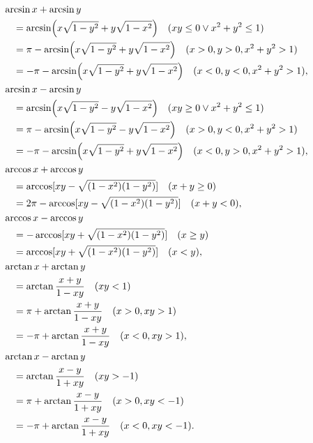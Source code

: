 \begin{theorem}[和差公式]
\begin{align}
&\hspace{-10pt}
\arcsin x + \arcsin y \\
	&= \arcsin(x \sqrt{1-y^2} + y \sqrt{1-x^2})
		\quad(xy\leq0 \lor x^2+y^2\leq1) \\
	&= \pi - \arcsin(x \sqrt{1-y^2} + y \sqrt{1-x^2})
		\quad(x>0, y>0, x^2+y^2>1) \\
	&= -\pi - \arcsin(x \sqrt{1-y^2} + y \sqrt{1-x^2})
		\quad(x<0, y<0, x^2+y^2>1), \\
&\hspace{-10pt}
\arcsin x - \arcsin y \\
	&= \arcsin(x \sqrt{1-y^2} - y \sqrt{1-x^2})
		\quad(xy\geq0 \lor x^2+y^2\leq1) \\
	&= \pi - \arcsin(x \sqrt{1-y^2} - y \sqrt{1-x^2})
		\quad(x>0, y<0, x^2+y^2>1) \\
	&= -\pi - \arcsin(x \sqrt{1-y^2} + y \sqrt{1-x^2})
		\quad(x<0, y>0, x^2+y^2>1), \\
&\hspace{-10pt}
\arccos x + \arccos y \\
	&= \arccos[xy - \sqrt{(1-x^2)(1-y^2)}]
		\quad(x+y\geq0) \\
	&= 2\pi - \arccos[xy - \sqrt{(1-x^2)(1-y^2)}]
		\quad(x+y<0), \\
&\hspace{-10pt}
\arccos x - \arccos y \\
	&= -\arccos[xy + \sqrt{(1-x^2)(1-y^2)}]
		\quad(x \geq y) \\
	&= \arccos[xy + \sqrt{(1-x^2)(1-y^2)}]
		\quad(x<y), \\
&\hspace{-10pt}
\arctan x + \arctan y \\
	&= \arctan\frac{x+y}{1-xy}
		\quad(xy<1) \\
	&= \pi+\arctan\frac{x+y}{1-xy}
		\quad(x>0,xy>1) \\
	&= -\pi+\arctan\frac{x+y}{1-xy}
		\quad(x<0,xy>1), \\
&\hspace{-10pt}
\arctan x - \arctan y \\
	&= \arctan\frac{x-y}{1+xy}
		\quad(xy>-1) \\
	&= \pi+\arctan\frac{x-y}{1+xy}
		\quad(x>0,xy<-1) \\
	&= -\pi+\arctan\frac{x-y}{1+xy}
		\quad(x<0,xy<-1).
\end{align}
\end{theorem}

